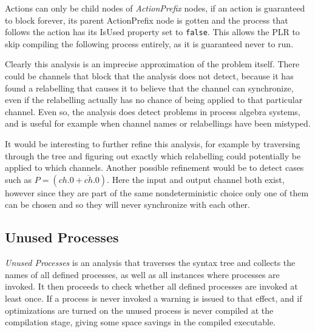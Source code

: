 	Actions can only be child nodes of \textit{ActionPrefix} nodes, if an 
	action is guaranteed to block forever, its parent \textsf{ActionPrefix}
	node is gotten and the process that follows the action has its 
	\textsf{IsUsed} property set to \texttt{false}. This allows the PLR to skip
	compiling the following process entirely, as it is guaranteed never to run.
	 
	Clearly this analysis is an imprecise approximation of the problem itself. 
	There could be channels that block that the analysis does not detect, because
	it has found a relabelling that causes it to believe that the channel can 
	synchronize, even if the relabelling actually has no chance of being applied
	to that particular channel. Even so, the analysis does detect problems in
	process algebra systems, and is useful for example when channel names or
	relabellings have been mistyped.
	
	It would be interesting to further refine this analysis, for example by 
	traversing through the tree and figuring out exactly which relabelling
	could potentially be applied to which channels. Another possible refinement
	would be to detect cases such as $P = (ch.0+\overline{ch}.0)$. Here the
	input and output channel both exist, however since they are part of the
	same nondeterministic choice only one of them can be chosen and so they
	will never synchronize with each other.

\subsection{Unused Processes}

	\textit{Unused Processes} is an analysis that traverses the syntax tree and
	collects the names of all defined processes, as well as all instances where
	processes are invoked. It then proceeds to check whether all defined processes
	are invoked at least once. If a process is never invoked a warning is issued
	to that effect, and if optimizations are turned on the unused process is 
	never compiled at the compilation stage, giving some space savings in the
	compiled executable.

	


	